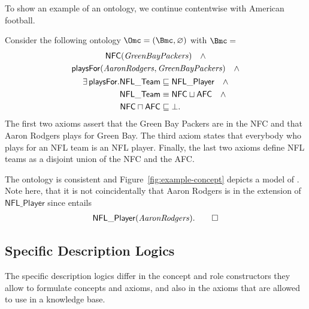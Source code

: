 To show an example of an ontology, we continue contentwise with American football.

\begin{example}\label{ex:bkb-nfl}
  Consider the following ontology $\Omc = (\Bmc,\emptyset)$ with $\Bmc =$
  \begin{gather*}
    \mathsf{NFC}(\text{\textit{GreenBayPackers}}) \quad\land\\
    \mathsf{playsFor}(\text{\textit{AaronRodgers}}, \text{\textit{GreenBayPackers}})\quad\land\\
    \begin{aligned}
      \exists\mathsf{playsFor}.\mathsf{NFL\_Team} & \sqsubseteq \mathsf{NFL\_Player}\quad\land\\
      \mathsf{NFL\_Team} & \equiv \mathsf{NFC} \sqcup \mathsf{AFC}\quad\land\\
      \mathsf{NFC} \sqcap \mathsf{AFC} & \sqsubseteq \bot.
    \end{aligned}
  \end{gather*}
  The first two axioms assert that the Green Bay Packers are in the NFC and that Aaron Rodgers plays
  for Green Bay. The third axiom states that everybody who plays for an NFL team is an NFL
  player. Finally, the last two axioms define NFL teams as a disjoint union of the NFC and the AFC.

  The ontology \Omc is consistent and Figure~\ref{fig:example-concept} depicts a model of \Omc. Note
  here, that it is not coincidentally that Aaron Rodgers is in the extension of
  $\mathsf{NFL\_Player}$ since \Omc entails
  \begin{gather*}
    \mathsf{NFL\_Player}(\text{\textit{AaronRodgers}}). \qedhere
  \end{gather*}
\end{example}

\subsection{Specific Description Logics}
\label{sec:specific-description-logics}

The specific description logics differ in the concept and role constructors they allow to formulate
concepts and axioms, and also in the axioms that are allowed to use in a knowledge base.

